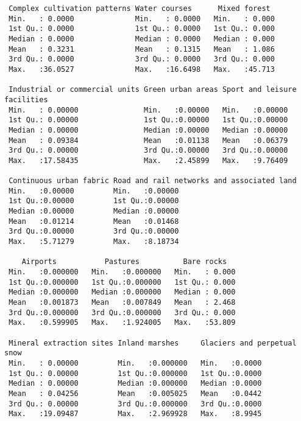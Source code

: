 \documentclass[
]{article}
\begin{document}
\begin{verbatim}
 Complex cultivation patterns Water courses      Mixed forest   
 Min.   : 0.0000              Min.   : 0.0000   Min.   : 0.000  
 1st Qu.: 0.0000              1st Qu.: 0.0000   1st Qu.: 0.000  
 Median : 0.0000              Median : 0.0000   Median : 0.000  
 Mean   : 0.3231              Mean   : 0.1315   Mean   : 1.086  
 3rd Qu.: 0.0000              3rd Qu.: 0.0000   3rd Qu.: 0.000  
 Max.   :36.0527              Max.   :16.6498   Max.   :45.713  
                                                                
 Industrial or commercial units Green urban areas Sport and leisure facilities
 Min.   : 0.00000               Min.   :0.00000   Min.   :0.00000             
 1st Qu.: 0.00000               1st Qu.:0.00000   1st Qu.:0.00000             
 Median : 0.00000               Median :0.00000   Median :0.00000             
 Mean   : 0.09384               Mean   :0.01138   Mean   :0.06379             
 3rd Qu.: 0.00000               3rd Qu.:0.00000   3rd Qu.:0.00000             
 Max.   :17.58435               Max.   :2.45899   Max.   :9.76409             
                                                                              
 Continuous urban fabric Road and rail networks and associated land
 Min.   :0.00000         Min.   :0.00000                           
 1st Qu.:0.00000         1st Qu.:0.00000                           
 Median :0.00000         Median :0.00000                           
 Mean   :0.01214         Mean   :0.01468                           
 3rd Qu.:0.00000         3rd Qu.:0.00000                           
 Max.   :5.71279         Max.   :8.18734                           
                                                                   
    Airports           Pastures          Bare rocks    
 Min.   :0.000000   Min.   :0.000000   Min.   : 0.000  
 1st Qu.:0.000000   1st Qu.:0.000000   1st Qu.: 0.000  
 Median :0.000000   Median :0.000000   Median : 0.000  
 Mean   :0.001873   Mean   :0.007849   Mean   : 2.468  
 3rd Qu.:0.000000   3rd Qu.:0.000000   3rd Qu.: 0.000  
 Max.   :0.599905   Max.   :1.924005   Max.   :53.809  
                                                       
 Mineral extraction sites Inland marshes     Glaciers and perpetual snow
 Min.   : 0.00000         Min.   :0.000000   Min.   :0.0000             
 1st Qu.: 0.00000         1st Qu.:0.000000   1st Qu.:0.0000             
 Median : 0.00000         Median :0.000000   Median :0.0000             
 Mean   : 0.04256         Mean   :0.005025   Mean   :0.0442             
 3rd Qu.: 0.00000         3rd Qu.:0.000000   3rd Qu.:0.0000             
 Max.   :19.09487         Max.   :2.969928   Max.   :8.9945             
                                                                        

\end{verbatim}
\end{document}
